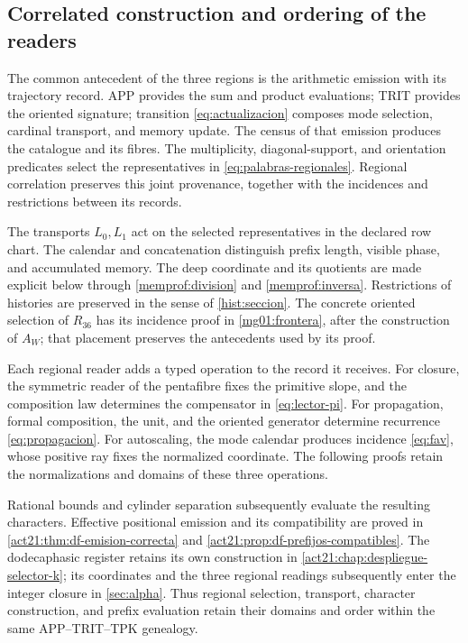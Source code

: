 \subsection{Correlated construction and ordering of the readers}
\label{gen:orden-constructor-correlacionado}

The common antecedent of the three regions is the arithmetic emission
with its trajectory record. APP provides the sum and product evaluations;
TRIT provides the oriented signature; transition \eqref{eq:actualizacion}
composes mode selection, cardinal transport, and memory update. The
census of that emission produces the catalogue and its fibres. The
multiplicity, diagonal-support, and orientation predicates select the
representatives in \eqref{eq:palabras-regionales}. Regional correlation
preserves this joint provenance, together with the incidences and
restrictions between its records.

The transports \(L_0,L_1\) act on the selected representatives in the
declared row chart. The calendar and concatenation distinguish prefix
length, visible phase, and accumulated memory. The deep coordinate and
its quotients are made explicit below through
\eqref{memprof:division} and \eqref{memprof:inversa}. Restrictions of
histories are preserved in the sense of \ref{hist:seccion}. The concrete
oriented selection of \(R_{36}\) has its incidence proof in
\ref{mg01:frontera}, after the construction of \(A_W\); that placement
preserves the antecedents used by its proof.

Each regional reader adds a typed operation to the record it receives.
For closure, the symmetric reader of the pentafibre fixes the primitive
slope, and the composition law determines the compensator in
\eqref{eq:lector-pi}. For propagation, formal composition, the unit,
and the oriented generator determine recurrence \eqref{eq:propagacion}.
For autoscaling, the mode calendar produces incidence \eqref{eq:fav},
whose positive ray fixes the normalized coordinate. The following proofs
retain the normalizations and domains of these three operations.

Rational bounds and cylinder separation subsequently evaluate the
resulting characters. Effective positional emission and its
compatibility are proved in \ref{act21:thm:df-emision-correcta} and
\ref{act21:prop:df-prefijos-compatibles}. The dodecaphasic register
retains its own construction in \ref{act21:chap:despliegue-selector-k};
its coordinates and the three regional readings subsequently enter the
integer closure in \ref{sec:alpha}. Thus regional selection, transport,
character construction, and prefix evaluation retain their domains and
order within the same APP--TRIT--TPK genealogy.
